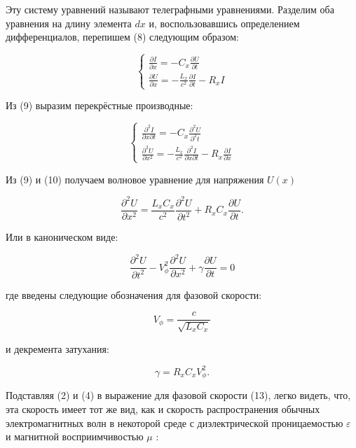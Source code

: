 \documentclass[a4paper,12 pt]{article}
\begin{document}
Эту систему уравнений называют телеграфными уравнениями. Разделим оба уравнения на длину элемента $d x$ и, воспользовавшись определением дифференциалов, перепишем (8) следующим образом:

\[
\left\{\begin{array}{l}
\frac{\partial I}{\partial x}=-C_{x} \frac{\partial U}{\partial t}  \tag{9}\\
\frac{\partial U}{\partial x}=-\frac{L_{x}}{c^{2}} \frac{\partial I}{\partial t}-R_{x} I
\end{array}\right.
\]

Из (9) выразим перекрёстные производные:

\[
\left\{\begin{array}{l}
\frac{\partial^{2} I}{\partial x \partial t}=-C_{x} \frac{\partial^{2} U}{\partial^{2} t}  \tag{10}\\
\frac{\partial^{2} U}{\partial x^{2}}=-\frac{L_{x}}{c^{2}} \frac{\partial^{2} I}{\partial x \partial t}-R_{x} \frac{\partial I}{\partial x}
\end{array}\right.
\]

Из (9) и (10) получаем волновое уравнение для напряжения $U(x)$


\begin{equation*}
\frac{\partial^{2} U}{\partial x^{2}}=\frac{L_{x} C_{x}}{c^{2}} \frac{\partial^{2} U}{\partial t^{2}}+R_{x} C_{x} \frac{\partial U}{\partial t} . \tag{11}
\end{equation*}


Или в каноническом виде:


\begin{equation*}
\frac{\partial^{2} U}{\partial t^{2}}-V_{\phi}^{2} \frac{\partial^{2} U}{\partial x^{2}}+\gamma \frac{\partial U}{\partial t}=0 \tag{12}
\end{equation*}


где введены следующие обозначения для фазовой скорости:


\begin{equation*}
V_{\phi}=\frac{c}{\sqrt{L_{x} C_{x}}} \tag{13}
\end{equation*}


и декремента затухания:


\begin{equation*}
\gamma=R_{x} C_{x} V_{\phi}^{2} . \tag{14}
\end{equation*}


Подставляя (2) и (4) в выражение для фазовой скорости (13), легко видеть, что, эта скорость имеет тот же вид, как и скорость распространения обычных электромагнитных волн в некоторой среде с диэлектрической проницаемостью $\varepsilon$ и магнитной восприимчивостью $\mu$ :
\end{document}
